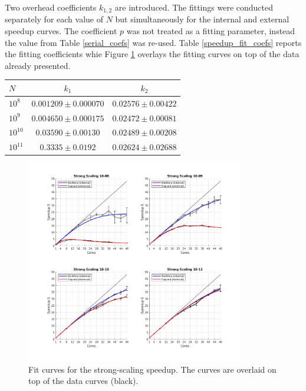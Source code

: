 \documentclass{article}
\begin{document}
Two overhead coefficients $k_{1,2}$ are introduced. The fittings were conducted separately for each value of $N$ but simultaneously for the internal and external speedup curves. The coefficient $p$ was not treated as a fitting parameter, instead the value from Table \ref{serial_coefs} was re-used. Table \ref{speedup_fit_coefs} reports the fitting coefficients whie Figure \ref{strong_scaling_fits} overlays the fitting curves on top of the data already presented.


\begin{center}
 \begin{tabular}{|l | c | c | } 
 \hline
 $N$ & $ k_1 $  & $k_2$ \\ 
 \hline
 \hline
 $10^{8}$ & $0.001209 \pm 0.000070 $  & $ 0.02576 \pm 0.00422$\\
 \hline
 $10^{9}$ &  $0.004650 \pm 0.000175 $  & $ 0.02472 \pm 0.00081 $\\
 \hline
 $10^{10}$ &  $0.03590 \pm 0.00130 $   & $ 0.02489 \pm 0.00208$\\
 \hline
 $10^{11}$ &  $0.3335 \pm 0.0192$ & $ 0.02624 \pm 0.02688$\\
 \hline
\end{tabular}
\label{speedup_fit_coefs}
\end{center}


\begin{figure}[H]
\centering
\includegraphics[width=0.85\textwidth]{strong_scaling_fits}
\caption{ Fit curves for the strong-scaling speedup. The curves are overlaid on top of the data curves (black). }
\label{strong_scaling_fits}
\end{figure}
\end{document}
